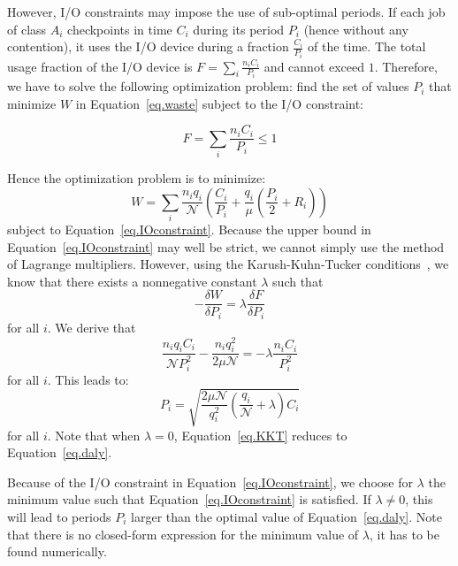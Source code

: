 \documentclass[two]{article}
\newcommand{\nbnodesplat}{{\mathcal N}}
\newcommand{\app}[1]{A_{#1}}
\newcommand{\nbapp}[1]{n_{#1}}
\newcommand{\nbnodes}[1]{q_{#1}}
\newcommand{\period}[1]{P_{#1}}
\newcommand{\ckpt}[1]{C_{#1}}
\newcommand{\reco}[1]{R_{#1}}
\newcommand{\mtbfplat}{\mu}
\newcommand{\wasteplat}{W}
\newcommand{\ioconstraint}{F}
\begin{document}
However, I/O constraints may impose the use of sub-optimal periods. If each job
of class $\app{i}$ checkpoints in time $\ckpt{i}$ during its period $\period{i}$ (hence
without any contention), it uses the I/O device during a fraction $\frac{\ckpt{i}}{\period{i}}$ of the time.
The total usage fraction of the  I/O device is $\ioconstraint = \sum_{i} \frac{\nbapp{i} \ckpt{i}}{\period{i}}$
and cannot exceed $1$. Therefore, we have to solve the following optimization problem: find
the set of values $\period{i}$ that minimize $\wasteplat$ in Equation~\eqref{eq.waste} subject to the I/O constraint:

\begin{equation}
\ioconstraint = \sum_{i} \frac{\nbapp{i} \ckpt{i}}{\period{i}} \leq 1
\label{eq.IOconstraint}
\end{equation}

Hence the optimization problem is to minimize:
\begin{equation}
\wasteplat = \sum_i \frac{\nbapp{i} \nbnodes{i}}{\nbnodesplat}  \left( \frac{\ckpt{i}}{\period{i}} +
\frac{\nbnodes{i}}{\mtbfplat}(\frac{\period{i}}{2} + \reco{i}) \right)
\label{eq.totalwaste}
\end{equation}
subject to Equation~\eqref{eq.IOconstraint}.
Because the upper bound in Equation~\eqref{eq.IOconstraint} may well be strict, we cannot simply use 
the method of Lagrange multipliers. However, 
using the Karush-Kuhn-Tucker conditions~\cite{Boyd2004}, we know that there exists a nonnegative constant
$\lambda$
such that
$$- \frac{\delta \wasteplat}{\delta \period{i}} = \lambda \frac{\delta \ioconstraint}{\delta \period{i}}$$
for all $i$. We derive that
$$\frac{\nbapp{i} \nbnodes{i} \ckpt{i}}{\nbnodesplat \period{i}^{2}} -    \frac{\nbapp{i} \nbnodes{i}^{2}}{2 \mtbfplat \nbnodesplat} = - \lambda \frac{\nbapp{i} \ckpt{i}}{\period{i}^{2}}
$$
for all $i$. This leads to:
 \begin{equation}
\period{i} = \sqrt{\frac{2 \mtbfplat  \nbnodesplat}{\nbnodes{i}^{2}} \left(\frac{\nbnodes{i}}{\nbnodesplat} +\lambda \right) \ckpt{i}}
  \label{eq.KKT}
\end{equation}
for all $i$. Note that when $\lambda=0$, Equation~\eqref{eq.KKT} reduces to Equation~\eqref{eq.daly}.

Because of the I/O constraint in Equation~\eqref{eq.IOconstraint}, we choose
for $\lambda$ the minimum value such that Equation~\eqref{eq.IOconstraint} is
satisfied. If $\lambda \neq 0$, this will lead to periods $P_{i}$ larger than
the optimal value of Equation~\eqref{eq.daly}. Note that there is no
closed-form expression for the minimum value of $\lambda$, it has to be found
numerically.
\end{document}
